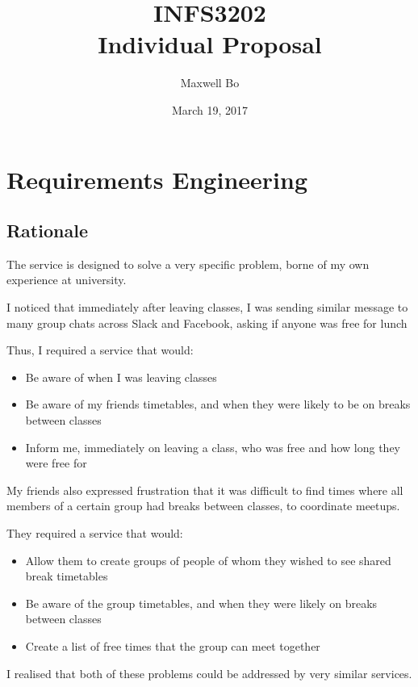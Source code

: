 \documentclass[11pt,a4paper]{report}
\begin{document}
\title{INFS3202 \\ Individual Proposal}
\author{Maxwell Bo}
\date{March 19, 2017}
\maketitle

\chapter{Requirements Engineering}

\section{Rationale}


The service is designed to solve a very specific problem, borne of my own experience at university.

I noticed that immediately after leaving classes, I was sending similar message to many group chats across Slack and Facebook, asking if anyone was free for lunch

Thus, I required a service that would:

\begin{itemize}
    \item Be aware of when I was leaving classes
    \item Be aware of my friends timetables, and when they were likely to be on breaks between classes
    \item Inform me, immediately on leaving a class, who was free and how long they were free for
\end{itemize}

My friends also expressed frustration that it was difficult to find times where all members of a certain group had breaks between classes, to coordinate meetups.

They required a service that would:

\begin{itemize}
    \item Allow them to create groups of people of whom they wished to see shared break timetables
    \item Be aware of the group timetables, and when they were likely on breaks between classes
    \item Create a list of free times that the group can meet together
\end{itemize}

I realised that both of these problems could be addressed by very similar services. 
\end{document}
